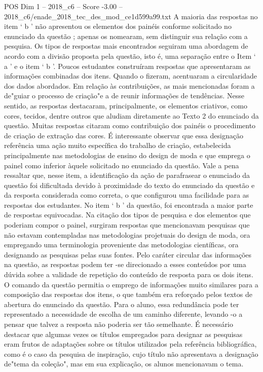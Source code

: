 \begin{textsample}{POS Dim 1 – 2018\_c6 – Score -3.00 – 2018\_c6/enade\_2018\_tec\_des\_mod\_ce1d599a99.txt}
A maioria das respostas no item ‘ b ’ não apresentou os elementos dos painéis conforme solicitado no enunciado da questão ; apenas os nomearam, sem distinguir sua relação com a pesquisa.
Os tipos de respostas mais encontrados seguiram uma abordagem de acordo com a divisão proposta pela questão, isto é, uma separação entre o Item ‘ a ’ e o item ‘ b ’.
Poucos estudantes construíram respostas que apresentaram as informações combinadas dos itens.
Quando o fizeram, acentuaram a circularidade dos dados abordados.
Em relação às contribuições, as mais mencionadas foram a de"guiar o processo de criação"e a de reunir informações de tendências.
Nesse sentido, as respostas destacaram, principalmente, os elementos criativos, como cores, tecidos, dentre outros que aludiam diretamente ao Texto 2 do enunciado da questão.
Muitas respostas citaram como contribuição dos painéis o procedimento de criação de extração das cores.
É interessante observar que essa designação referência uma ação muito específica do trabalho de criação, estabelecida principalmente nas metodologias de ensino do design de moda e que emprega o painel como inferior àquele solicitado no enunciado da questão.
Vale a pena ressaltar que, nesse item, a identificação da ação de parafrasear o enunciado da questão foi dificultada devido à proximidade do texto do enunciado da questão e da resposta considerada como correta, o que configurou uma facilidade para as respostas dos estudantes.
No item ‘ b ’ da questão, foi encontrada a maior parte de respostas equivocadas.
Na citação dos tipos de pesquisa e dos elementos que poderiam compor o painel, surgiram respostas que mencionavam pesquisas que não estavam contempladas nas metodologias projetuais do design de moda, ora empregando uma terminologia proveniente das metodologias científicas, ora designando as pesquisas pelas suas fontes.
Pelo caráter circular das informações na questão, as respostas podem ter -se direcionado a esses conteúdos por uma dúvida sobre a validade de repetição do conteúdo de resposta para os dois itens.
O comando da questão permitia o emprego de informações muito similares para a composição das respostas dos itens, o que também era reforçado pelos textos de abertura do enunciado da questão.
Para o aluno, essa redundância pode ter representado a necessidade de escolha de um caminho diferente, levando -o a pensar que talvez a resposta não poderia ser tão semelhante.
É necessário destacar que algumas vezes os títulos empregados para designar as pesquisas eram frutos de adaptações sobre os títulos utilizados pela referência bibliográfica, como é o caso da pesquisa de inspiração, cujo título não apresentava a designação de"tema da coleção", mas em sua explicação, os alunos mencionavam o tema.

\end{textsample}
